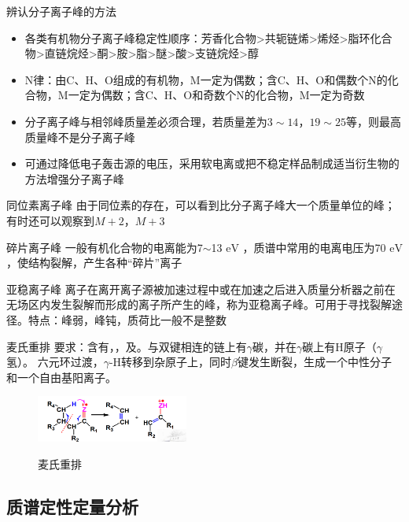 \begin{note}
    辨认分子离子峰的方法
    \begin{itemize}
        \item 各类有机物分子离子峰稳定性顺序：芳香化合物>共轭链烯>烯烃>脂环化合物>直链烷烃>酮>胺>脂>醚>酸>支链烷烃>醇
        \item N律：由C、H、O组成的有机物，M一定为偶数；含C、H、O和偶数个N的化合物，M一定为偶数；含C、H、O和奇数个N的化合物，M一定为奇数
        \item 分子离子峰与相邻峰质量差必须合理，若质量差为$3\sim 14$，$19\sim 25$等，则最高质量峰不是分子离子峰
        \item 可通过降低电子轰击源的电压，采用软电离或把不稳定样品制成适当衍生物的方法增强分子离子峰
    \end{itemize}
\end{note}
 \begin{definition*}{同位素离子峰}
    由于同位素的存在，可以看到比分子离子峰大一个质量单位的峰；有时还可以观察到$M+2$，$M+3$
 \end{definition*}
 \begin{definition*}{ 碎片离子峰}
   一般有机化合物的电离能为7$\sim$13 $\mathrm{eV}$ ，质谱中常用的电离电压为70 $\mathrm{eV}$，使结构裂解，产生各种“碎片”离子
 \end{definition*}
 \begin{definition*}{亚稳离子峰}
    离子在离开离子源被加速过程中或在加速之后进入质量分析器之前在无场区内发生裂解而形成的离子所产生的峰，称为亚稳离子峰。可用于寻找裂解途径。特点：峰弱，峰钝，质荷比一般不是整数
 \end{definition*}
\begin{theorem*}{麦氏重排}
    要求：含有，，及。与双键相连的链上有$\gamma$碳，并在$\gamma$碳上有H原子（$\gamma$氢）。
六元环过渡，$\gamma$-H转移到杂原子上，同时$\beta$键发生断裂，生成一个中性分子和一个自由基阳离子。

\end{theorem*}
\begin{figure}[ht]
    \centering
    \includegraphics[width=5cm]{image/chp2_m_reform.png}
    \label{fig:chp2_reform}
    \caption[]{麦氏重排}
\end{figure}



\subsection{质谱定性定量分析}
